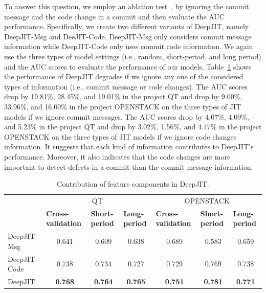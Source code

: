 To answer this question, we employ an ablation test~\cite{korbar2017deep, liu2017deep}, by ignoring the commit message and the code change in a commit and then evaluate the AUC performance. Specifically, we create two different variants of DeepJIT, namely DeepJIT-Msg and DeeJIT-Code. DeepJIT-Msg only considers commit message information while DeepJIT-Code only uses commit code information. We again use the three types of model settings (i.e., random, short-period, and long period) and the AUC scores to evaluate the performance of our models. Table~\ref{tab:variants} shows the performance of DeepJIT degrades if we ignore any one of the considered types of information (i.e., commit message or code changes). The AUC scores drop by 19.81\%, 28.45\%, and 19.01\% in the project QT and drop by 9.00\%, 33.96\%, and 16.00\% in the project OPENSTACK on the three types of JIT models if we ignore commit messages. The AUC scores drop by 4.07\%, 4.09\%, and 5.23\% in the project QT and drop by 3.02\%, 1.56\%, and 4.47\% in the project OPENSTACK on the three types of JIT models if we ignore code changes information. It suggests that each kind of information contributes to DeepJIT's performance. Moreover, it also indicates that the code changes are more important to detect defects in a commit than the commit message information. 

\begin{table}[t!]
  \centering
  \caption{Contribution of feature components in DeepJIT.}
    \begin{tabular}{|l|c|c|c|c|c|c|}
    \hline
    \multirow{2}[4]{*}{} & \multicolumn{3}{c|}{QT} & \multicolumn{3}{c|}{OPENSTACK} \\
\cline{2-7}          & \multicolumn{1}{l|}{\textbf{Cross-validation}} & \multicolumn{1}{l|}{\textbf{Short-period}} & \multicolumn{1}{l|}{\textbf{Long-period}} & \multicolumn{1}{l|}{\textbf{Cross-validation}} & \multicolumn{1}{l|}{\textbf{Short-period}} & \multicolumn{1}{l|}{\textbf{Long-period}} \\
    \hline
    \hline
    DeepJIT-Msg & 0.641 & 0.609 & 0.638 & 0.689 & 0.583 & 0.659 \\
    \hline
    DeepJIT-Code & 0.738 & 0.734 & 0.727 & 0.729 & 0.769 & 0.738 \\
    \hline
    DeepJIT & \textbf{0.768} & \textbf{0.764} & \textbf{0.765} & \textbf{0.751} & \textbf{0.781} & \textbf{0.771} \\
    \hline
    \end{tabular}%
  \label{tab:variants}%

\end{table}%

